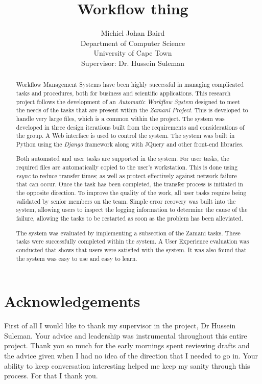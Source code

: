 \documentclass[12pt,a4paper]{report}
\title{Workflow thing}
\author{Michiel Johan Baird \\
        Department of Computer Science \\
        University of Cape Town
    \\   \small{Supervisor: Dr. Hussein Suleman} }
\begin{document}

\begin{abstract}
Workflow Management Systems have been highly successful in managing complicated
tasks and procedures, both for business and scientific applications. This
research project follows the development of an \emph{Automatic Workflow System}
designed to meet the needs of the tasks that are present within the
\emph{Zamani Project}. This is developed to handle very large files, which is a
common within the project. The system was developed in three design iterations
built from the requirements and considerations of the group. A Web interface
is used to control the system. The system was built in Python using the \emph{Django}
framework along with JQuery and other front-end libraries.

Both automated and user tasks are supported in the system. For user tasks, the
required files are automatically copied to the user's workstation. This is done
using \emph{rsync} to reduce transfer times; as well as protect effectively
against network failure that can occur. Once the task has been completed, the
transfer process is initiated in the opposite direction. To improve
the quality of the work, all user tasks require being validated by senior
members on the team. Simple error recovery was built into the system, allowing
users to inspect the logging information to determine the cause of the failure,
allowing the tasks to be restarted as soon as the problem has been alleviated.

The system was evaluated by implementing a subsection of the Zamani tasks.
These tasks were successfully completed within the system. A User
Experience evaluation was conducted that shows that users  were
satisfied with the system. It was also found that the system was easy to use and
easy to learn.


\end{abstract}
\chapter*{Acknowledgements}
First of all I would like to thank my supervisor in the project, Dr Hussein
Suleman. Your advice and leadership was instrumental throughout this entire
project. Thank you so much for the early mornings spent reviewing drafts and the
advice given when I had no idea of the direction that I needed to go in. Your
ability to keep conversation interesting helped me keep my sanity through this
process. For that I thank you.
\end{document}
